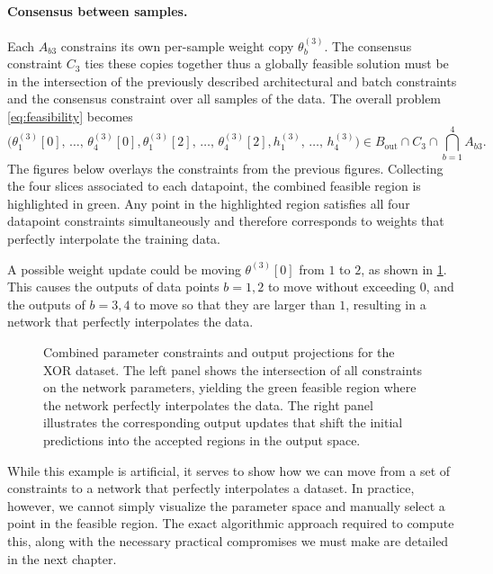\paragraph{Consensus between samples.}
Each $A_{b3}$ constrains its own per-sample weight copy $\theta_b^{(3)}$. The consensus constraint $C_3$ ties these copies together thus a globally feasible solution must be in the intersection of the previously described architectural and batch constraints and the consensus constraint over all samples of the data. The overall problem \eqref{eq:feasibility} becomes
\begin{equation*}
  \bigl(\theta^{(3)}_1[0],\,\ldots,\,\theta^{(3)}_4[0], \theta^{(3)}_1[2],\,\ldots,\,\theta^{(3)}_4[2],
             h_1^{(3)},\, \ldots,\, h_4^{(3)}\bigr)
\in B_{\mathrm{out}}\cap C_3 \cap \bigcap_{b=1}^{4} A_{b3}.
\end{equation*}
The figures below overlays the constraints from the previous figures. Collecting the four slices associated to each datapoint, the combined feasible region is highlighted in green. Any point in the highlighted region satisfies all four datapoint constraints simultaneously and therefore corresponds to weights that perfectly interpolate the training data.

A possible weight update could be moving $\theta^{(3)}[0]$ from $1$ to $2$, as shown in \cref{fig:xor_constraints_combined_w1_wb}. This causes the outputs of data points $b=1, 2$ to move without exceeding $0$, and the outputs of $b=3, 4$ to move so that they are larger than $1$, resulting in a network that perfectly interpolates the data.

\begin{figure}[ht]
\vspace{1em}
\centering
\begin{subfigure}[t]{0.35\textwidth}
\centering

\end{subfigure}
\hfill
\begin{subfigure}[t]{0.4\textwidth}
\centering

\end{subfigure}
\caption{Combined parameter constraints and output projections for the XOR dataset. The left panel shows the intersection of all constraints on the network parameters, yielding the green feasible region where the network perfectly interpolates the data. The right panel illustrates the corresponding output updates that shift the initial predictions into the accepted regions in the output space.}
\label{fig:xor_constraints_combined_w1_wb}
\end{figure}

While this example is artificial, it serves to show how we can move from a set of constraints to a network that perfectly interpolates a dataset. In practice, however, we cannot simply visualize the parameter space and manually select a point in the feasible region. The exact algorithmic approach required to compute this, along with the necessary practical compromises we must make are detailed in the next chapter.
